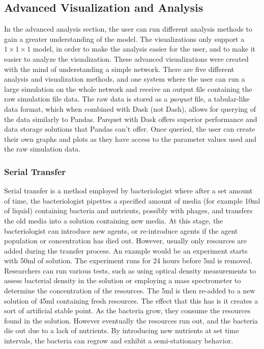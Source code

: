 \subsection{Advanced Visualization and Analysis}
In the advanced analysis section, the user can run different analysis methods to gain a greater understanding of the model. 
The visualizations only support a $1 \times 1\times 1$ model, in order to make the analysis easier for the user, and to make it easier to analyze the visualization. 
These advanced visualizations were created with the mind of understanding a simple network. 
There are five different analysis and visualization methods, and one system where the user can run a large simulation on the whole network and receive an output file containing the raw simulation file data. 
The raw data is stored as a \textit{parquet} file, a tabular-like data format, which when combined with Dask (not Dash), allows for querying of the data similarly to Pandas. 
Parquet with Dask offers superior performance and data storage solutions that Pandas can't offer. 
Once queried, the user can create their own graphs and plots as they have access to the parameter values used and the raw simulation data. 

\subsubsection{Serial Transfer}
Serial transfer is a method employed by bacteriologist where after a set amount of time, the bacteriologist pipettes a specified amount of media (for example 10ml of liquid) containing bacteria and  nutrients, possibly with phages, and transfers the old media into a solution containing new media. 
At this stage, the bacteriologist can introduce new agents, or re-introduce agents if the agent population or concentration has died out. 
However, usually only resources are added during the transfer process. 
An example would be an experiment starts with 50ml of solution. 
The experiment runs for 24 hours before 5ml is removed. 
Researchers can run various tests, such as using optical density measurements to assess bacterial density in the solution or employing a mass spectrometer to determine the concentration of the resources. 
The 5ml is then re-added to a new solution of 45ml containing fresh resources. 
The effect that this has is it creates a sort of artificial stable point. 
As the bacteria grow, they consume the resources found in the solution. 
However eventually the resources run out, and the bacteria die out due to a lack of nutrients. 
By introducing new nutrients at set time intervals, the bacteria can regrow and exhibit a semi-stationary behavior. 
\newline 

